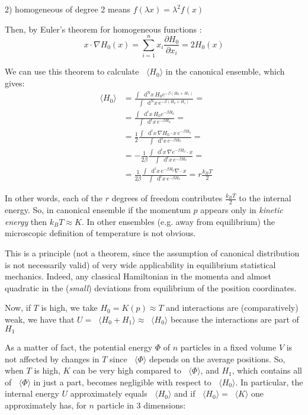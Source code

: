 \documentclass{article}
\newcommand*\Diff[1]{\mathop{}\!\mathrm{d^#1}}
\newcommand*\mean[1]{\mathop{} \! \langle #1 \rangle}
\begin{document}
2) homogeneous of degree 2 means $f(\lambda x) = \lambda^2 f(x)$
\newline


Then, by Euler's theorem for homogeneous functions : $$x \cdot \nabla H_0(x) = \sum_{i=1}^{n} x_i \frac{\partial H_0}{\partial x_i} = 2 H_0(x)$$

We can use this theorem to calculate $\mean{H_0}$ in the canonical ensemble, which gives:
\begin{align*}
\mean{H_0} &= \frac{\int \Diff{N}{x}  \, H_0 e^{-\beta (H_0+ H_1)} }{\int \Diff{N}{x}  \, e^{-\beta (H_0+ H_1)}  } = \\
&= \frac{\int \Diff{r}{x} \, H_0 e^{-\beta H_0} }{\int \Diff{r}{x} \, e^{-\beta H_0}} = \\
&= \frac{1}{2} \frac{\int \Diff{r}{x} \, \nabla H_0 \cdot x \,  e^{-\beta H_0}  }{\int \Diff{r}{x} \, e^{-\beta H_0}} =  \\
&=  - \frac{1}{2 \beta} \frac{\int \Diff{r}{x} \, \nabla  e^{-\beta H_0} \cdot x }{\int \Diff{r}{x} \, e^{-\beta H_0} } =\\
&= \frac{1}{2\beta} \frac{\int \Diff{r}{x} \, e^{-\beta H_0} \nabla \cdot x}{\int \Diff{r}{x} \, e^{-\beta H_0} } = r\frac{k_B T}{2}
\end{align*}

In other words, each of the $r$ degrees of freedom contributes $\frac{k_B T}{2}$ to the internal energy. So, in canonical ensemble if the momentum $p$ appears only in \emph{kinetic energy} then $k_B T \approx K$. In other ensembles (e.g. away from equilibrium) the microscopic definition of temperature is not obvious.  

This is a principle (not a theorem, since the assumption of canonical distribution is not necessarily valid) of very wide applicability in equilibrium statistical mechanics. Indeed, any classical Hamiltonian in the momenta and almost quadratic in the (\emph{small}) deviations from equilibrium of the position coordinates. \newline

Now, if $T$ is high, we take $H_0 = K(p) \approx T$ and interactions are (comparatively) weak, we have that $U=\mean{H_0+H_1 }\approx \mean{ H_0}$ because the interactions are part of $H_1$

As a matter of fact, the potential energy $\Phi$ of $n$ particles in a fixed volume $V$ is not affected by changes in $T$ since $\mean \Phi$ depends on the average positions. So, when $T$ is high, $K$ can be very high compared to $\mean\Phi$, and $H_1$, which contains all of  $\mean\Phi$ in just a part, becomes negligible with respect to $\mean {H_0}$. In particular, the internal energy $U$ approximately equals $\mean{H_0}$ and if $\mean{H_0}= \mean K$ one approximately has, for $n$ particle in 3 dimensions:
\end{document}
